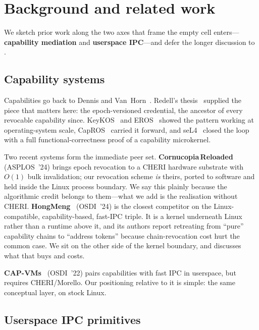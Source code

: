 \section{Background and related work}
\label{sec:bg}

We sketch prior work along the two axes that frame the empty cell
\sysname enters---\textbf{capability mediation} and \textbf{userspace
IPC}---and defer the longer discussion to .

\subsection{Capability systems}
\label{sec:bg:cap}

Capabilities go back to Dennis and Van~Horn~\cite{dennis1966}.
Redell's thesis~\cite{redell74} supplied the piece that matters here:
the epoch-versioned credential, the ancestor of every revocable
capability since. KeyKOS~\cite{keykos} and EROS~\cite{shapiro1999eros}
showed the pattern working at operating-system scale,
CapROS~\cite{capros} carried it forward, and seL4~\cite{klein2009sel4}
closed the loop with a full functional-correctness proof of a
capability microkernel.

Two recent systems form the immediate peer set.
\textbf{Cornucopia\,Reloaded}~\cite{cornucopia-reloaded} (ASPLOS~'24)
brings epoch revocation to a CHERI hardware substrate with $O(1)$
bulk invalidation; our revocation scheme \emph{is} theirs, ported to
software and held inside the Linux process boundary. We say this
plainly because the algorithmic credit belongs to them---what we add
is the realisation without CHERI.
\textbf{HongMeng}~\cite{hongmeng} (OSDI~'24) is the closest
competitor on the Linux-compatible, capability-based, fast-IPC
triple. It is a kernel underneath Linux rather than a runtime above
it, and its authors report retreating from ``pure'' capability chains
to ``address tokens'' because chain-revocation cost hurt the common
case. We sit on the other side of the kernel boundary, and
 discusses what that buys and costs.

\textbf{CAP-VMs}~\cite{capvms} (OSDI~'22) pairs capabilities with
fast IPC in userspace, but requires CHERI/Morello. Our positioning
relative to it is simple: the same conceptual layer, on stock Linux.

\subsection{Userspace IPC primitives}
\label{sec:bg:ipc}

